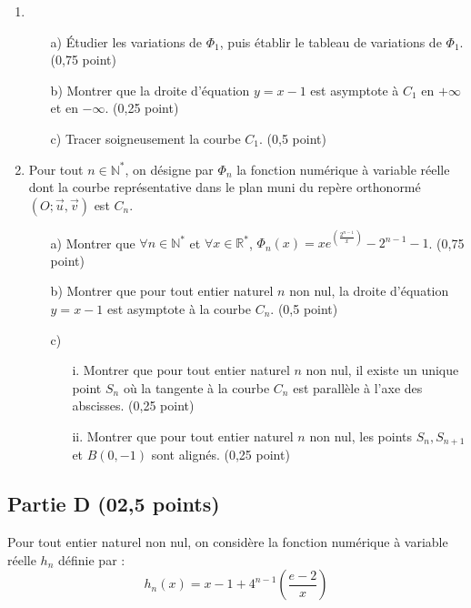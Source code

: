 \documentclass[11pt]{article}
\begin{document}
\begin{enumerate}
    \item 
    \begin{enumerate}
        \item[a)] Étudier les variations de \( \Phi_1 \), puis établir le tableau de variations de \( \Phi_1 \). \hfill (0,75 point)
        \item[b)] Montrer que la droite d'équation \( y = x - 1 \) est asymptote à \( C_1 \) en \( +\infty \) et en \( -\infty \). \hfill (0,25 point)
        \item[c)] Tracer soigneusement la courbe \( C_1 \). \hfill (0,5 point)
    \end{enumerate}

    \item Pour tout \( n \in \mathbb{N}^* \), on désigne par \( \Phi_n \) la fonction numérique à variable réelle dont la courbe représentative dans le plan muni du repère orthonormé \( (O ; \vec{u}, \vec{v}) \) est \( C_n \).
    \begin{enumerate}
        \item[a)] Montrer que \( \forall n \in \mathbb{N}^* \) et \( \forall x \in \mathbb{R}^* \), \( \Phi_n(x) = x e^{\left(\frac{2^{n-1}}{x}\right)} - 2^{n-1} - 1 \). \hfill (0,75 point)
        \item[b)] Montrer que pour tout entier naturel \( n \) non nul, la droite d'équation \( y = x - 1 \) est asymptote à la courbe \( C_n \). \hfill (0,5 point)
        \item[c)] 
        \begin{enumerate}
            \item[i.] Montrer que pour tout entier naturel \( n \) non nul, il existe un unique point \( S_n \) où la tangente à la courbe \( C_n \) est parallèle à l'axe des abscisses. \hfill (0,25 point)
            \item[ii.] Montrer que pour tout entier naturel \( n \) non nul, les points \( S_n, S_{n+1} \) et \( B(0, -1) \) sont alignés. \hfill (0,25 point)
        \end{enumerate}
    \end{enumerate}    
\end{enumerate}

\subsection*{Partie D (02,5 points)}

Pour tout entier naturel non nul, on considère la fonction numérique à variable réelle \( h_n \) définie par :
\[
    h_n(x) = x - 1 + 4^{n-1}\left(\frac{e - 2}{x}\right)
\]
\end{document}
